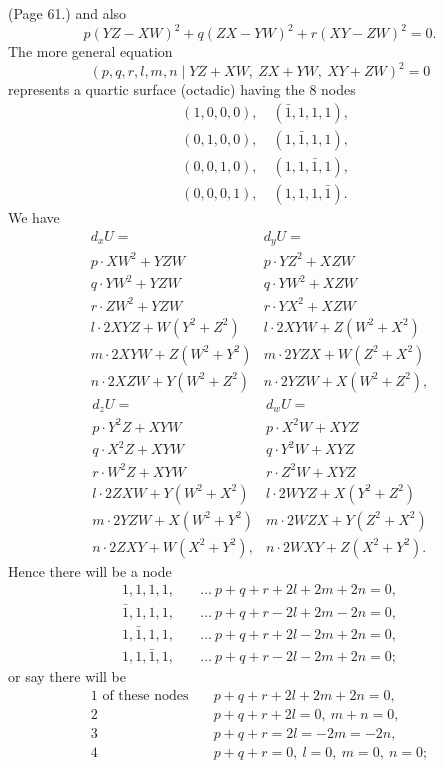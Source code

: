 \documentclass[11pt,a4paper]{article}
\begin{document}
\noindent (Page 61.) and also
\[
p(YZ - XW)^2 + q(ZX - YW)^2 + r(XY - ZW)^2 = 0.
\]
The more general equation
\[
(p, q, r, l, m, n \mid YZ + XW,\ ZX + YW,\ XY + ZW)^2 = 0
\]
represents a quartic surface (octadic) having the $8$ nodes
\begin{align*}
& (1, 0, 0, 0),\quad (\bar{1}, 1, 1, 1), \\
& (0, 1, 0, 0),\quad (1, \bar{1}, 1, 1), \\
& (0, 0, 1, 0),\quad (1, 1, \bar{1}, 1), \\
& (0, 0, 0, 1),\quad (1, 1, 1, \bar{1}).
\end{align*}
We have
\[
\begin{array}{l|l}
d_x U = & d_y U = \\
\hline
p \cdot X W^2 + YZW & p \cdot Y Z^2 + XZW \\
q \cdot YW^2 + YZW & q \cdot YW^2 + XZW \\
r \cdot ZW^2 + YZW & r \cdot YX^2 + XZW \\
l \cdot 2XYZ + W(Y^2 + Z^2) & l \cdot 2XYW + Z(W^2 + X^2) \\
m \cdot 2XYW + Z(W^2 + Y^2) & m \cdot 2YZX + W(Z^2 + X^2) \\
n \cdot 2XZW + Y(W^2 + Z^2) & n \cdot 2YZW + X(W^2 + Z^2),
\end{array}
\]
\[
\begin{array}{l|l}
d_z U = & d_w U = \\
\hline
p \cdot Y^2 Z + XYW & p \cdot X^2 W + XYZ \\
q \cdot X^2 Z + XYW & q \cdot Y^2 W + XYZ \\
r \cdot W^2 Z + XYW & r \cdot Z^2 W + XYZ \\
l \cdot 2ZXW + Y(W^2 + X^2) & l \cdot 2WYZ + X(Y^2 + Z^2) \\
m \cdot 2YZW + X(W^2 + Y^2) & m \cdot 2WZX + Y(Z^2 + X^2) \\
n \cdot 2ZXY + W(X^2 + Y^2), & n \cdot 2WXY + Z(X^2 + Y^2).
\end{array}
\]
Hence there will be a node
\begin{align*}
1, 1, 1, 1,\quad &\ldots\ p + q + r + 2l + 2m + 2n = 0, \\
\bar{1}, 1, 1, 1,\quad &\ldots\ p + q + r - 2l + 2m - 2n = 0, \\
1, \bar{1}, 1, 1,\quad &\ldots\ p + q + r + 2l - 2m + 2n = 0, \\
1, 1, \bar{1}, 1,\quad &\ldots\ p + q + r - 2l - 2m + 2n = 0;
\end{align*}
or say there will be
\begin{align*}
1 \text{ of these nodes} &\quad p + q + r + 2l + 2m + 2n = 0, \\
2 \quad\quad &\quad p + q + r + 2l = 0,\ m + n = 0, \\
3 \quad\quad &\quad p + q + r = 2l = -2m = -2n, \\
4 \quad\quad &\quad p + q + r = 0,\ l = 0,\ m = 0,\ n = 0;
\end{align*}
\end{document}
